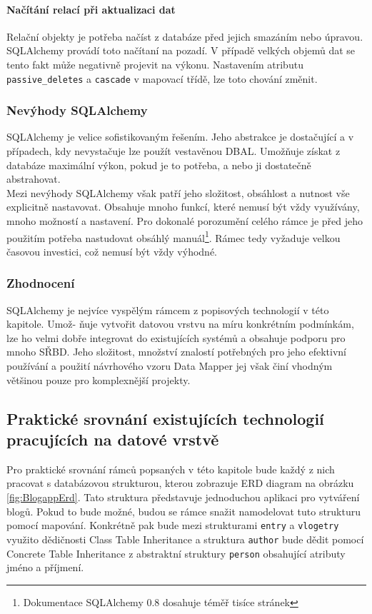 \documentclass[ing,male,java,dept456]{diploma}						%
\begin{document}
\paragraph{Načítání relací při aktualizaci dat}
Relační objekty je potřeba načíst z databáze před jejich smazáním nebo úpravou. SQLAlchemy provádí toto načítaní na pozadí. V případě velkých objemů dat se tento fakt může negativně projevit na výkonu. Nastavením atributu \lstinline[style=inlinepython]|passive_deletes| a \lstinline[style=inlinepython]|cascade| v mapovací třídě, lze toto chování změnit.

\subsubsection{Nevýhody SQLAlchemy}
SQLAlchemy je velice sofistikovaným řešením. Jeho abstrakce je dostačující a v případech, kdy nevystačuje lze použít vestavěnou DBAL. Umožňuje získat z databáze maximální výkon, pokud je to potřeba, a nebo ji dostatečně abstrahovat. \\
Mezi nevýhody SQLAlchemy však patří jeho složitost, obsáhlost a nutnost vše explicitně nastavovat. Obsahuje mnoho funkcí, které nemusí být vždy využívány, mnoho možností a nastavení. Pro dokonalé porozumění celého rámce je před jeho použitím potřeba nastudovat obsáhlý manuál\footnote{Dokumentace SQLAlchemy 0.8 dosahuje téměř tisíce stránek}. Rámec tedy vyžaduje velkou časovou investici, což nemusí být vždy výhodné.

\subsubsection{Zhodnocení}

SQLAlchemy je nejvíce vyspělým rámcem z popisových technologií v této kapitole. Umož- ňuje vytvořit datovou vrstvu na míru konkrétním podmínkám, lze ho velmi dobře integrovat do existujících systémů a obsahuje podporu pro mnoho SŘBD. Jeho složitost, množství znalostí potřebných pro jeho efektivní používání a použití návrhového vzoru Data Mapper jej však činí vhodným většinou pouze pro komplexnější projekty.

\subsection{Praktické srovnání existujících technologií pracujících na datové vrstvě}
\label{subsec:CodeCompare}

Pro praktické srovnání rámců popsaných v této kapitole bude každý z nich pracovat s databázovou strukturou, kterou zobrazuje ERD diagram na obrázku \ref{fig:BlogappErd}. Tato struktura představuje jednoduchou aplikaci pro vytváření blogů. Pokud to bude možné, budou se rámce snažit namodelovat tuto strukturu pomocí mapování. Konkrétně pak bude mezi strukturami \lstinline[style=inlinepython]|entry| a \lstinline[style=inlinepython]|vlogetry| využito dědičnosti Class Table Inheritance a struktura \lstinline[style=inlinepython]|author| bude dědit pomocí Concrete Table Inheritance z abstraktní struktury \lstinline[style=inlinepython]|person| obsahující atributy jméno a příjmení. \\
\end{document}
